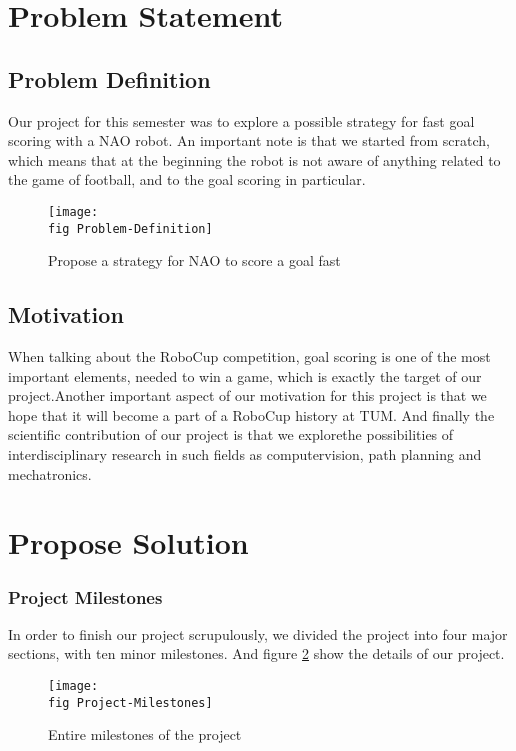 \section{Problem Statement}
\label{sec problem statement}
\subsection*{Problem Definition}
Our project for this semester was to explore a possible strategy for fast goal
scoring with a NAO robot. An important note is that we started from scratch,
which means that at the beginning the robot is not aware of anything related to
the game of football, and to the goal scoring in particular.

\begin{figure}[ht]
	\texttt{[image: \\fig Problem-Definition]}
	\caption{Propose a strategy for NAO to score a goal fast}
	\label{W a strategy for Nao}
\end{figure}


\subsection*{Motivation}
When talking about the RoboCup
competition, goal scoring is one of the
most important elements, needed to win a game, which is exactly the target of our project.Another important aspect of our motivation for this project is that we hope that it will become a part of a RoboCup history at TUM. And finally the scientific contribution of our project is that we explorethe possibilities of interdisciplinary research in such fields as computervision, path planning and mechatronics.

 
\section{Propose Solution}
\subsubsection*{Project Milestones}


In order to finish our project scrupulously, we divided the project into four major sections, with ten minor milestones. And figure \ref{W milestones of the project} show the details of our project. 

 
\begin{figure}[ht]
	\texttt{[image: \\fig Project-Milestones]}
	\caption{Entire milestones of the project}
	\label{W milestones of the project}

\end{figure}

